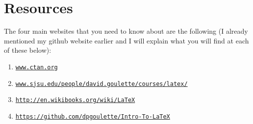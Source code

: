 \documentclass[11pt]{article}
\begin{document}
\section{Resources}
The four main websites that you need to know about are the following (I already mentioned my github website earlier and I will explain what you will find at each of these below):
\begin{enumerate}
\item \href{www.ctan.org}{\texttt{www.ctan.org}}
\item \href{https://www.sjsu.edu/people/david.goulette/courses/latex/}{\texttt{www.sjsu.edu/people/david.goulette/courses/latex/}}
\item \href{http://en.wikibooks.org/wiki/LaTeX}{\texttt{http://en.wikibooks.org/wiki/LaTeX}}
\item \href{https://github.com/dpgoulette/Intro-To-LaTeX}{\texttt{https://github.com/dpgoulette/Intro-To-LaTeX}}
\end{enumerate}
\end{document}
